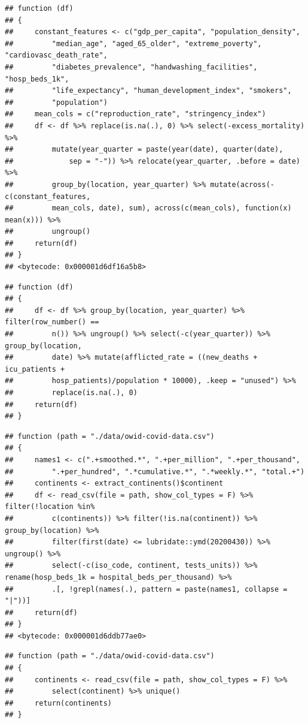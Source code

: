 \documentclass[11pt,preprint, authoryear]{elsarticle}
\numberwithin{equation}{section}
\numberwithin{figure}{section}
\numberwithin{table}{section}
\begin{document}
\begin{verbatim}
## function (df) 
## {
##     constant_features <- c("gdp_per_capita", "population_density", 
##         "median_age", "aged_65_older", "extreme_poverty", "cardiovasc_death_rate", 
##         "diabetes_prevalence", "handwashing_facilities", "hosp_beds_1k", 
##         "life_expectancy", "human_development_index", "smokers", 
##         "population")
##     mean_cols = c("reproduction_rate", "stringency_index")
##     df <- df %>% replace(is.na(.), 0) %>% select(-excess_mortality) %>% 
##         mutate(year_quarter = paste(year(date), quarter(date), 
##             sep = "-")) %>% relocate(year_quarter, .before = date) %>% 
##         group_by(location, year_quarter) %>% mutate(across(-c(constant_features, 
##         mean_cols, date), sum), across(c(mean_cols), function(x) mean(x))) %>% 
##         ungroup()
##     return(df)
## }
## <bytecode: 0x000001d6df16a5b8>
\end{verbatim}

\begin{verbatim}
## function (df) 
## {
##     df <- df %>% group_by(location, year_quarter) %>% filter(row_number() == 
##         n()) %>% ungroup() %>% select(-c(year_quarter)) %>% group_by(location, 
##         date) %>% mutate(afflicted_rate = ((new_deaths + icu_patients + 
##         hosp_patients)/population * 10000), .keep = "unused") %>% 
##         replace(is.na(.), 0)
##     return(df)
## }
\end{verbatim}

\begin{verbatim}
## function (path = "./data/owid-covid-data.csv") 
## {
##     names1 <- c(".+smoothed.*", ".+per_million", ".+per_thousand", 
##         ".+per_hundred", ".*cumulative.*", ".*weekly.*", "total.+")
##     continents <- extract_continents()$continent
##     df <- read_csv(file = path, show_col_types = F) %>% filter(!location %in% 
##         c(continents)) %>% filter(!is.na(continent)) %>% group_by(location) %>% 
##         filter(first(date) <= lubridate::ymd(20200430)) %>% ungroup() %>% 
##         select(-c(iso_code, continent, tests_units)) %>% rename(hosp_beds_1k = hospital_beds_per_thousand) %>% 
##         .[, !grepl(names(.), pattern = paste(names1, collapse = "|"))]
##     return(df)
## }
## <bytecode: 0x000001d6ddb77ae0>
\end{verbatim}

\begin{verbatim}
## function (path = "./data/owid-covid-data.csv") 
## {
##     continents <- read_csv(file = path, show_col_types = F) %>% 
##         select(continent) %>% unique()
##     return(continents)
## }
\end{verbatim}
\end{document}
